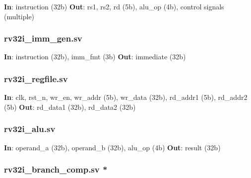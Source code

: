 \begin{record}

\textbf{In}: instruction (32b) \textbf{Out}: rs1, rs2, rd (5b), alu\_op
(4b), control signals (multiple)

\end{record}

\subsubsection{\texorpdfstring{rv32i\_\allowbreak{}imm\_\allowbreak{}gen.sv}{rv32i\_imm\_gen.sv}}\label{cr:fix:cpu-dataflow-diagram:rv32i-imm-gensv}

\begin{record}

\textbf{In}: instruction (32b), imm\_fmt (3b) \textbf{Out}: immediate
(32b)

\end{record}

\subsubsection{\texorpdfstring{rv32i\_\allowbreak{}regfile.sv}{rv32i\_regfile.sv}}\label{cr:fix:cpu-dataflow-diagram:rv32i-regfilesv}

\begin{record}

\textbf{In}: clk, rst\_n, wr\_en, wr\_addr (5b), wr\_data (32b),
rd\_addr1 (5b), rd\_addr2 (5b) \textbf{Out}: rd\_data1 (32b), rd\_data2
(32b)

\end{record}

\subsubsection{\texorpdfstring{rv32i\_\allowbreak{}alu.sv}{rv32i\_alu.sv}}\label{cr:fix:cpu-dataflow-diagram:rv32i-alusv}

\begin{record}

\textbf{In}: operand\_a (32b), operand\_b (32b), alu\_op (4b)
\textbf{Out}: result (32b)

\end{record}

\subsubsection{\texorpdfstring{rv32i\_\allowbreak{}branch\_\allowbreak{}comp.sv
\textbf{*}}{rv32i\_branch\_comp.sv }}\label{cr:fix:cpu-dataflow-diagram:rv32i-branch-compsv-star}

